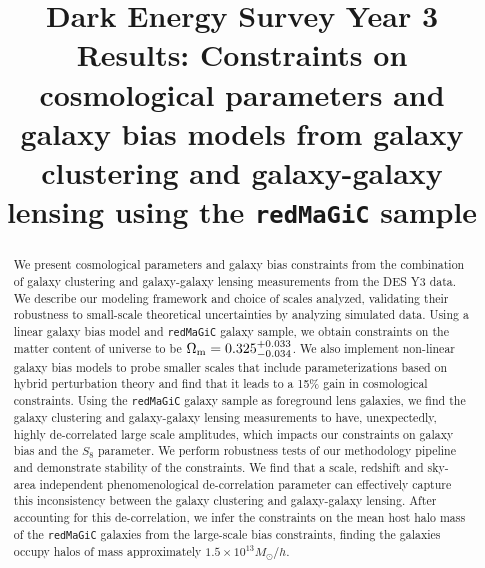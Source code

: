 \documentclass[aps, prd,twocolumn,superscriptaddress,nofootinbib,preprintnumbers]{revtex4-1}
\newcommand{\redmagic}{\texttt{redMaGiC} }
\begin{document}
\title[Short title, max. 45 characters]{Dark Energy Survey Year 3 Results: Constraints on cosmological parameters and galaxy bias models from galaxy clustering and galaxy-galaxy lensing using the \redmagic sample}


\label{firstpage}


\begin{abstract}
We present cosmological parameters and galaxy bias constraints from the combination of galaxy clustering and galaxy-galaxy lensing measurements from the DES Y3 data. We describe our modeling framework and choice of scales analyzed, validating their robustness to small-scale theoretical uncertainties by analyzing simulated data. Using a linear galaxy bias model and \redmagic galaxy sample, we obtain constraints on the matter content of universe to be $\Omega_{\rm m} = 0.325^{+0.033}_{-0.034}$. We also implement non-linear galaxy bias models to probe smaller scales that include parameterizations based on hybrid perturbation theory and find that it leads to a 15\% gain in cosmological constraints. Using the \redmagic galaxy sample as foreground lens galaxies, we find the galaxy clustering and galaxy-galaxy lensing measurements to have, unexpectedly, highly de-correlated large scale amplitudes, which impacts our constraints on galaxy bias and the $S_8$ parameter. We perform robustness tests of our methodology pipeline and demonstrate stability of the constraints. We find that a scale, redshift and sky-area independent phenomenological de-correlation parameter can effectively capture this inconsistency between the galaxy clustering and galaxy-galaxy lensing. After accounting for this de-correlation, we infer the constraints on the mean host halo mass of the \redmagic galaxies from the large-scale bias constraints, finding the galaxies occupy halos of mass approximately $1.5 \times 10^{13} M_{\odot}/h$. 
\end{abstract}






\maketitle
\end{document}
